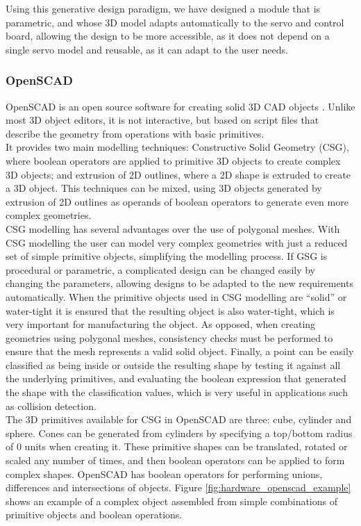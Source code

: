 Using this generative design paradigm, we have designed a module that is parametric, and whose 3D model adapts automatically to the servo and control board, allowing the design to be more accessible, as it does not depend on a single servo model and reusable, as it can adapt to the user needs.\\

\subsubsection{OpenSCAD}
\label{hardware_software_openscad}
OpenSCAD is an open source software for creating solid 3D CAD objects \cite{openscad:website}. Unlike most 3D object editors, it is not interactive, but based on script files that describe the geometry from operations with basic primitives.\\

It provides two main modelling techniques: Constructive Solid Geometry (CSG), where boolean operators are applied to primitive 3D objects to create complex 3D objects; and extrusion of 2D outlines, where a 2D shape is extruded to create a 3D object. This techniques can be mixed, using 3D objects generated by extrusion of 2D outlines as operands of boolean operators to generate even more complex geometries.\\

CSG modelling has several advantages over the use of polygonal meshes. With CSG modelling the user can model very complex geometries with just a reduced set of simple primitive objects, simplifying the modelling process. If GSG is procedural or parametric, a complicated design can be changed easily by changing the parameters, allowing designs to be adapted to the new requirements automatically. When the primitive objects used in CSG modelling are ``solid'' or water-tight it is ensured that the resulting object is also water-tight, which is very important for manufacturing the object. As opposed, when creating geometries using  polygonal meshes, consistency checks must be performed to ensure that the mesh represents a valid solid object. Finally, a point can be easily classified as being inside or outside the resulting shape by testing it against all the underlying primitives, and evaluating the boolean expression that generated the shape with the classification values, which is very useful in applications such as collision detection.\\

The 3D primitives available for CSG in OpenSCAD are three: cube, cylinder and sphere. Cones can be generated from cylinders by specifying a top/bottom radius of 0 units when creating it. These primitive shapes can be translated, rotated or scaled any number of times, and then boolean operators can be applied to form complex shapes. OpenSCAD has boolean operators for performing unions, differences and intersections of objects. Figure \ref{fig:hardware_openscad_example} shows an example of a complex object assembled from simple combinations of primitive objects and boolean operations.\\


